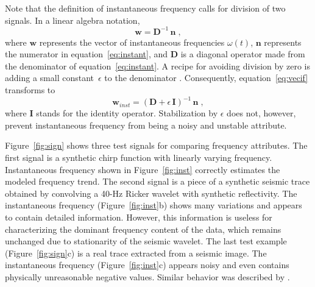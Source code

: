 Note that the definition of instantaneous frequency calls for division
of two signals. In a linear algebra notation,
\begin{equation}
  \label{eq:vecif}
  \mathbf{w} = \mathbf{D}^{-1}\,\mathbf{n}\;,
\end{equation}
where $\mathbf{w}$ represents the vector of instantaneous frequencies
$\omega(t)$, $\mathbf{n}$ represents the numerator in
equation~\ref{eq:instant}, and $\mathbf{D}$ is a diagonal operator
made from the denominator of equation~\ref{eq:instant}. A recipe for
avoiding division by zero is adding a small constant~$\epsilon$ to the
denominator \cite[]{nowack}. Consequently, equation~\ref{eq:vecif}
transforms to
\begin{equation}
  \label{eq:vecife}
  \mathbf{w}_{inst} = \left(\mathbf{D}+\epsilon\,\mathbf{I}\right)^{-1}\,\mathbf{n}\;,
\end{equation}
where $\mathbf{I}$ stands for the identity operator. Stabilization by
$\epsilon$ does not, however, prevent instantaneous frequency from
being a noisy and unstable attribute. 

Figure~\ref{fig:sign} shows three test signals for comparing frequency
attributes. The first signal is a synthetic chirp function with
linearly varying frequency. Instantaneous frequency shown in
Figure~\ref{fig:inst} correctly estimates the modeled frequency trend.
The second signal is a piece of a synthetic seismic trace obtained by
convolving a 40-Hz Ricker wavelet with synthetic reflectivity. The
instantaneous frequency (Figure~\ref{fig:inst}b) shows many variations
and appears to contain detailed information. However, this information
is useless for characterizing the dominant frequency content of the
data, which remains unchanged due to stationarity of the seismic
wavelet. The last test example (Figure~\ref{fig:sign}c) is a real
trace extracted from a seismic image.  The instantaneous frequency
(Figure~\ref{fig:inst}c) appears noisy and even contains physically
unreasonable negative values. Similar behavior was described by
\cite{TLE10-07-00260032}.



